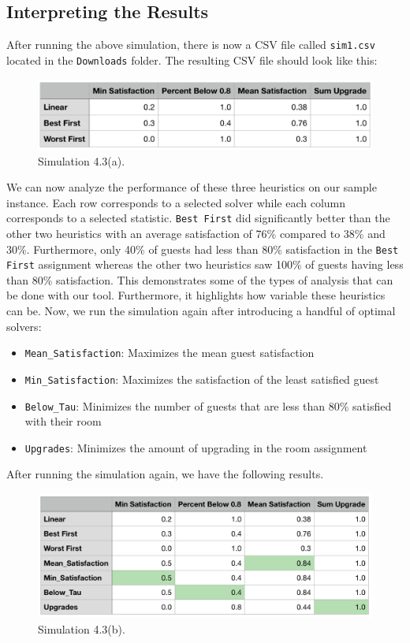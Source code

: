 \documentclass[11 pt]{article}
\begin{document}
\subsection{Interpreting the Results}
After running the above simulation, there is now a CSV file called \texttt{sim1.csv} located in the \texttt{Downloads} folder. The resulting CSV file should look like this:
\begin{figure}[H]
    \begin{center}
  \includegraphics[scale=0.6]{images/sim1CSV.png}
  \caption{Simulation 4.3(a).}
  \end{center}
\end{figure}
\vspace{-0.5cm}
\par We can now analyze the performance of these three heuristics on our sample instance. Each row corresponds to a selected solver while each column corresponds to a selected statistic. \texttt{Best First} did significantly better than the other two heuristics with an average satisfaction of 76\% compared to 38\% and 30\%. Furthermore, only 40\% of guests had less than 80\% satisfaction in the \texttt{Best First} assignment whereas the other two heuristics saw 100\% of guests having less than 80\% satisfaction. This demonstrates some of the types of analysis that can be done with our tool. Furthermore, it highlights how variable these heuristics can be. Now, we run the simulation again after introducing a handful of optimal solvers:
\begin{itemize}
    \item \texttt{Mean\_Satisfaction}: Maximizes the mean guest satisfaction 
    \item \texttt{Min\_Satisfaction}: Maximizes the satisfaction of the least satisfied guest 
    \item \texttt{Below\_Tau}: Minimizes the number of guests that are less than 80\% satisfied with their room
    \item \texttt{Upgrades}: Minimizes the amount of upgrading in the room assignment
\end{itemize}
After running the simulation again, we have the following results.
\begin{figure}[H]
    \begin{center}
  \includegraphics[scale=0.6]{images/sim2CSV.png}
  \caption{Simulation 4.3(b).}
  \end{center}
\end{figure}
\end{document}
